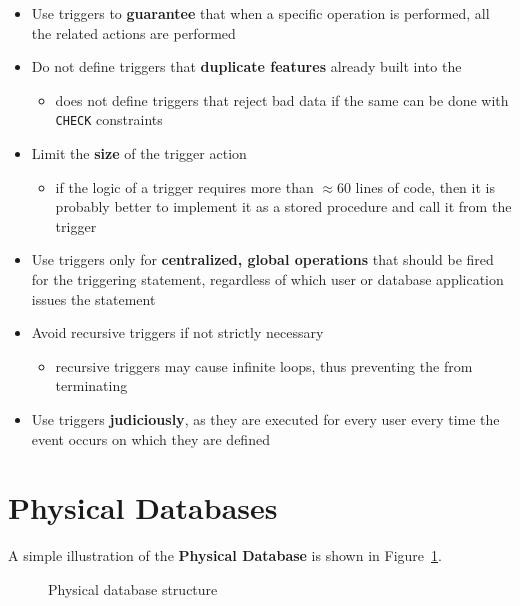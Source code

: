 \documentclass[english]{article}
\begin{document}
\begin{itemize}
  \item Use triggers to \textbf{guarantee} that when a specific operation is performed, all the related actions are performed
  \item Do not define triggers that \textbf{duplicate features} already built into the \dbms
        \begin{itemize}[label=\(\rightarrow\)]
          \item does not define triggers that reject bad data if the same can be done with \sql \texttt{CHECK} constraints
        \end{itemize}
  \item Limit the \textbf{size} of the trigger action
        \begin{itemize}[label=\(\rightarrow\)]
          \item if the logic of a trigger requires more than \(\approx 60\) lines of code, then it is probably better to implement it as a stored procedure and call it from the trigger
        \end{itemize}
  \item Use triggers only for \textbf{centralized, global operations} that should be fired for the triggering statement, regardless of which user or database application issues the statement
  \item Avoid recursive triggers if not strictly necessary
        \begin{itemize}[label=\(\rightarrow\)]
          \item recursive triggers may cause infinite loops, thus preventing the \dbms from terminating
        \end{itemize}
  \item Use triggers \textbf{judiciously}, as they are executed for every user every time the event occurs on which they are defined
\end{itemize}

\clearpage

\section{Physical Databases}

A simple illustration of the \textbf{Physical Database} is shown in Figure~\ref{fig:physical-database}.

\begin{figure}[htbp]
  \centering
  \bigskip
  \caption{Physical database structure}
  \label{fig:physical-database}
  \bigskip
\end{figure}
\end{document}
